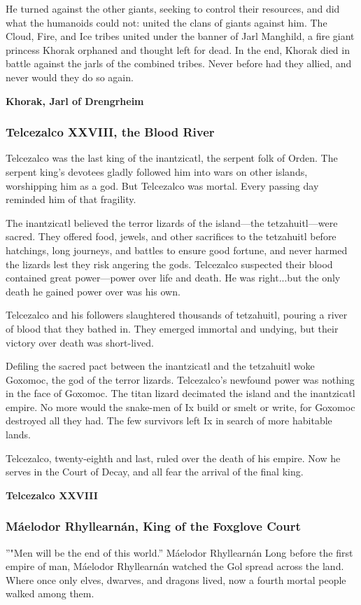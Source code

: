 \documentclass[10pt,a4paper,twoside,bg=print,twocolumn,openany,nodeprecatedcode]{dndbook}
\begin{document}
He turned against the other giants, seeking to control their resources, and did what the humanoids could not: united the clans of giants against him. The Cloud, Fire, and Ice tribes united under the banner of Jarl Manghild, a fire giant princess Khorak orphaned and thought left for dead. In the end, Khorak died in battle against the jarls of the combined tribes. Never before had they allied, and never would they do so again.

\textbf{Khorak, Jarl of Drengrheim}

\subsubsection{Telcezalco XXVIII, the Blood River}
Telcezalco was the last king of the inantzicatl, the serpent folk of Orden. The serpent king's devotees gladly followed him into wars on other islands, worshipping him as a god. But Telcezalco was mortal. Every passing day reminded him of that fragility.

The inantzicatl believed the terror lizards of the island—the tetzahuitl—were sacred. They offered food, jewels, and other sacrifices to the tetzahuitl before hatchings, long journeys, and battles to ensure good fortune, and never harmed the lizards lest they risk angering the gods. Telcezalco suspected their blood contained great power—power over life and death. He was right...but the only death he gained power over was his own.

Telcezalco and his followers slaughtered thousands of tetzahuitl, pouring a river of blood that they bathed in. They emerged immortal and undying, but their victory over death was short-lived.

Defiling the sacred pact between the inantzicatl and the tetzahuitl woke Goxomoc, the god of the terror lizards. Telcezalco's newfound power was nothing in the face of Goxomoc. The titan lizard decimated the island and the inantzicatl empire. No more would the snake-men of Ix build or smelt or write, for Goxomoc destroyed all they had. The few survivors left Ix in search of more habitable lands.

Telcezalco, twenty-eighth and last, ruled over the death of his empire. Now he serves in the Court of Decay, and all fear the arrival of the final king.

\textbf{Telcezalco XXVIII}

\subsubsection{Máelodor Rhyllearnán, King of the Foxglove Court}
\DndQuote%
{}
{''"Men will be the end of this world.''}
{Máelodor Rhyllearnán}
Long before the first empire of man, Máelodor Rhyllearnán watched the Gol spread across the land. Where once only elves, dwarves, and dragons lived, now a fourth mortal people walked among them.
\end{document}
